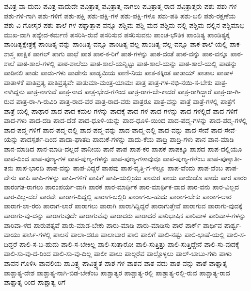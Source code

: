 {ಪವಿತ್ರ-ವಾ-ದುದು
ಪವಿತ್ರ-ವಾದುದೇ
ಪವಿತ್ರಾತ್ಮ
ಪವಿತ್ರಾತ್ಮ-ನಾಗಲು
ಪವಿತ್ರಾತ್ಮ-ರಾದ
ಪವಿತ್ರಾತ್ಮರು
ಪಶು
ಪಶು-ಗಳ
ಪಶು-ಗಳಿ-ಗಾಗಿ
ಪಶು-ಗಳಿಗೆ
ಪಶು-ಪಕ್ಷಿ
ಪಶು-ಪಕ್ಷಿ-ಗಳ
ಪಶು-ಪಕ್ಷಿ-ಗಳೂ
ಪಶು-ಪತಿ
ಪಶು-ಬಲಿ
ಪಶು-ರಕ್ಷಣೆಯ
ಪಶು-ವಿ-ಗೋಸ್ಕರ
ಪಶು-ಶಾಲೆ-ಗಳ
ಪಶ್ಚಾತ್ತಾಪ-ವನ್ನೂ
ಪಶ್ಚಿಮ
ಪಶ್ಚಿ-ಮದ
ಪಶ್ಚಿಮ-ದಲ್ಲಿ
ಪಶ್ಚಿಮ-ದಲ್ಲಿನ
ಪಶ್ಚಿಮಾಭಿ-ಮುಖ-ವಾಗಿ
ಪಶ್ಯೇದ-ಕರ್ಮಣಿ
ಪಸರಿಸಿ-ರುವೆ
ಪಸರಿಸುವ
ಪಸರಿಸುವನು
ಪಾಂಚ-ಭೌತಿಕ
ಪಾಂಡಿತ್ಯ
ಪಾಂಡಿತ್ಯಕ್ಕೆ
ಪಾಂಡಿತ್ಯಕ್ಷೇತ್ರಕ್ಕೆ
ಪಾಂಡಿತ್ಯ-ವನ್ನು
ಪಾಂಡಿತ್ಯ-ವನ್ನೂ
ಪಾಂಡಿತ್ಯ-ವಲ್ಲ
ಪಾಂಡಿತ್ಯ-ವೆಲ್ಲ-ವನ್ನೂ
ಪಾಕ-ಶಾಲೆ-ಯಲ್ಲಿ
ಪಾಕ-ಶಾಸ್ತ್ರ
ಪಾಕ್ಷಿಕ
ಪಾಗಲ್
ಪಾಗು
ಪಾಛೆ
ಪಾಠ
ಪಾಠ-ಕ-ರಿಗೆ
ಪಾಠ-ಗಳನ್ನು
ಪಾಠ-ದಂತೆ
ಪಾಠ-ವನ್ನು
ಪಾಠ-ವನ್ನೂ
ಪಾಠ-ಶಾಲೆ
ಪಾಠ-ಶಾಲೆ-ಗಳಲ್ಲಿ
ಪಾಠ-ಶಾಲೆಯ
ಪಾಠ-ಶಾಲೆ-ಯನ್ನಿಟ್ಟು
ಪಾಠ-ಶಾಲೆ-ಯನ್ನು
ಪಾಠ-ಶಾಲೆ-ಯಲ್ಲಿ
ಪಾಡನ್ನು
ಪಾಡಿನಲಿ
ಪಾಡು
ಪಾಡು-ಗಳು
ಪಾಡೇನು
ಪಾಡ್ಯಮಿಯ
ಪಾಣಿ-ನಿಯ
ಪಾತ-ಕಕ್ಕಿಂತ
ಪಾತಾಯ್
ಪಾತಾಲ
ಪಾತಾಳ
ಪಾತಾಳಕೆ
ಪಾತಿವ್ರತ್ಯ
ಪಾತಿವ್ರತ್ಯವೇ
ಪಾತುಮಾ-ಮಂತ್ರ-ಯಾಮಃ
ಪಾತ್ರ
ಪಾತ್ರ-ಗಳ-ನಭಿ-ನಯಿ-ಸ-ಬೇಕು
ಪಾತ್ರ-ನಾಗಿದ್ದನು
ಪಾತ್ರ-ನಾಗುವೆ
ಪಾತ್ರ-ನಾದ
ಪಾತ್ರ-ಭೇದ-ಗಳಿಂದ
ಪಾತ್ರ-ರಾಗ-ಬೇ-ಕಾದರೆ
ಪಾತ್ರ-ರಾಗಿದ್ದಾರೆ
ಪಾತ್ರ-ರಾ-ಗಿ-ರುವ
ಪಾತ್ರ-ರಾ-ಗಿ-ರುವಿರಿ
ಪಾತ್ರ-ರಾದ-ವರ
ಪಾತ್ರ-ರಾದ-ವರು
ಪಾತ್ರರೂ
ಪಾತ್ರ-ವನ್ನು
ಪಾತ್ರೆ
ಪಾತ್ರೆ-ಗಳಲ್ಲಿ
ಪಾತ್ರೆಗೆ
ಪಾತ್ರೆ-ಯಲ್ಲಿ
ಪಾಥಾರ
ಪಾದ
ಪಾದ-ಕಮಲ-ಗಳನ್ನು
ಪಾದಕ್ಕೆ
ಪಾದ-ಗಳ
ಪಾದ-ಗಳನ್ನು
ಪಾದ-ಗಳಲ್ಲಿದೆ
ಪಾದ-ಗಳಿಗೆ
ಪಾದ-ಗಳು
ಪಾದ-ದಡಿ
ಪಾದ-ದೆಡೆ
ಪಾದ-ಧೂಳಿ-ಯನ್ನು
ಪಾದ-ಧೂಳಿ-ಯಿಂದ
ಪಾದ-ಪದ್ಮ-ಗಳನ್ನು
ಪಾದ-ಪದ್ಮ-ಗಳಲ್ಲಿ
ಪಾದ-ಪದ್ಮ-ಗಳಿಗೆ
ಪಾದ-ಪದ್ಮ-ದಲ್ಲಿ
ಪಾದ-ಪದ್ಮ-ವನ್ನು
ಪಾದ-ಪಾದ್ಮ-ದಲ್ಲಿ
ಪಾದ-ವನ್ನು
ಪಾದ-ಸೇವೆ
ಪಾದ-ಸೇವೆ-ಯನ್ನು
ಪಾದಸ್ಪರ್ಶ-ದಿಂದ
ಪಾದಾ-ಘಾತದಿ
ಪಾದುಕೆ-ಗಳನ್ನು
ಪಾದು-ಕೆಯ
ಪಾದ್ರಿ
ಪಾದ್ರಿ-ಗಳು
ಪಾನ
ಪಾನ-ಮಾಡಿ
ಪಾನ-ಮಾಡಿದ
ಪಾನ-ಮಾಡಿ-ದಲ್ಲದೆ
ಪಾನೀಯ
ಪಾನೆ
ಪಾಪ
ಪಾಪ-ಕರ
ಪಾಪಕೆ
ಪಾಪಕ್ಕೂ
ಪಾಪದ
ಪಾಪ-ದಲ್ಲಿಯೂ
ಪಾಪ-ದಿಂದ
ಪಾಪ-ಪುಣ್ಯ-ಗಳ
ಪಾಪ-ಪುಣ್ಯ-ಗಳನ್ನು
ಪಾಪ-ಪುಣ್ಯ-ಗಳಾವುವೂ
ಪಾಪ-ಪುಣ್ಯ-ಗಳೆಂಬ
ಪಾಪ-ಪುಣ್ಯಾತೀ-ತನು
ಪಾಪ-ಭಾರದಿ
ಪಾಪ-ವನ್ನು
ಪಾಪ-ವಿದ್ದರೆ
ಪಾಪವು
ಪಾಪ-ವೃತ್ತಿ-ಗ-ಳಲ್ಲೂ
ಪಾಪ-ವೆಂದು
ಪಾಪ-ವೆಂಬ
ಪಾಪ-ವೇನು
ಪಾಪಿ
ಪಾಪಿ-ಗಳನ್ನು
ಪಾಪಿ-ಗಳಿಗೆ
ಪಾಪಿಗೆ
ಪಾಪಿ-ಯಲ್ಲಿಯು
ಪಾಮರ
ಪಾಯ
ಪಾಯಿಚೊ
ಪಾಯೆ
ಪಾರ
ಪಾರಂ
ಪಾರಂಗತ-ರಾಗಲು
ಪಾರಂಪರ್ಯ-ವಾಗಿ
ಪಾರಕೆ
ಪಾರ-ಮಾರ್ಥಿಕ
ಪಾರ-ಮಾರ್ಥಿಕ-ವಾದ
ಪಾರ-ವನು
ಪಾರ-ವಿಲ್ಲದ
ಪಾರ-ವಿಲ್ಲ-ದಲೆ
ಪಾರವೇ
ಪಾರಾಗ-ದಿದ್ದಲ್ಲಿ
ಪಾರಾಗ-ಬಲ್ಲಿರಿ
ಪಾರಾಗ-ಬ-ಹುದು
ಪಾರಾಗ-ಬೇಕು
ಪಾರಾಗ-ಲಾರ
ಪಾರಾಗ-ಲಾ-ರರು
ಪಾರಾಗ-ಲಾರೆ
ಪಾರಾಗಲು
ಪಾರಾಗಿ
ಪಾರಾಗಿದ್ದಿದ್ದರೆ
ಪಾರಾಗುತ್ತೇವೆ
ಪಾರಾಗುವ
ಪಾರಾಗು-ವುದಕ್ಕೆ
ಪಾರಾಗು-ವು-ದನ್ನು
ಪಾರಾಗುವುದೇ
ಪಾರಾಗುವೆವು
ಪಾರಾದರು
ಪಾರಾದರೆ
ಪಾರಿಭಾಷಿಕ
ಪಾರಿವಾಳ
ಪಾರಿವಾಳ-ಗಳನ್ನು
ಪಾರಿವಾ-ಳದ
ಪಾರುಪತ್ಯವೆ
ಪಾರು-ಮಾಡ-ಬೇಕು
ಪಾರು-ಮಾಡಿ
ಪಾರು-ಮಾಡಿಸು
ಪಾರೆ
ಪಾರ್ಕ್
ಪಾರ್ಥಿವ
ಪಾರ್ಶ್ವ-ವಾಯು
ಪಾರ್ಸಿ-ಗಳಲ್ಲಿ
ಪಾಲನೆ
ಪಾಲಾ-ದರೂ
ಪಾಲಾಬಾರ
ಪಾಲಿ
ಪಾಲಿಗೆ
ಪಾಲಿ-ನಷ್ಟು
ಪಾಲಿ-ಭಾಷೆ-ಯಲ್ಲಿ
ಪಾಲಿ-ಸ-ದಿದ್ದರೆ
ಪಾಲಿ-ಸ-ಬ-ಹುದು
ಪಾಲಿ-ಸ-ಬೇಕಿಲ್ಲ
ಪಾಲಿ-ಸುತ್ತಾರೋ
ಪಾಲಿ-ಸುತ್ತಿತ್ತು
ಪಾಲಿ-ಸುತ್ತಿದ್ದೇನೆ
ಪಾಲಿ-ಸು-ವುದಕ್ಕೆ
ಪಾಲಿ-ಸು-ವು-ದ-ರಿಂದ
ಪಾಲಿ-ಸು-ವು-ದಿಲ್ಲ
ಪಾಲೀ
ಪಾಲು
ಪಾಲ್ಗರೆವ
ಪಾಲ್ಗೊಳ್ಳಲು
ಪಾಲ್-ಬಾಬು-ಗಳು
ಪಾಳು
ಪಾವನ-ಗೊಳಿಸಿ
ಪಾವಲಿಯ
ಪಾವಿತ್ರ್ಯ
ಪಾವಿತ್ರ್ಯತೆ
ಪಾಶ-ಗಳ
ಪಾಶವ
ಪಾಶ-ವದು
ಪಾಶ-ವನ್ನು
ಪಾಶೆ
ಪಾಶ್ಚಾತ್ಯ
ಪಾಶ್ಚಾತ್ಯ-ದೇಶ
ಪಾಶ್ಚಾತ್ಯ-ನಾಗಿ-ಬಿಡ-ಬೇಕೆಂಬ
ಪಾಶ್ಚಾತ್ಯರ
ಪಾಶ್ಚಾತ್ಯ-ರಲ್ಲಿ
ಪಾಶ್ಚಾತ್ಯ-ರಲ್ಲಿ-ರುವ
ಪಾಶ್ಚಾತ್ಯ-ರಾದ
ಪಾಶ್ಚಾತ್ಯ-ರಿಂದ
ಪಾಶ್ಚಾತ್ಯ-ರಿಗೆ
}
